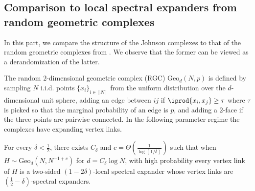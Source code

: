
\subsection{Comparison to local spectral expanders from random geometric complexes}
In this part, we compare the structure of the Johnson complexes to that of the random geometric complexes from \cite{LiuMSY2023}. 
We observe that the former can be viewed as a derandomization of the latter.



The random $2$-dimensional geometric complex (RGC) $\mathrm{Geo}_d(N,p)$ is defined by sampling $N$ i.i.d. points $\{x_i\}_{i\in[N]}$ from the uniform distribution over the $d$-dimensional unit sphere, adding an edge between $ij$ if $\iprod{x_i,x_j} \ge \tau$ where $\tau$ is picked so that the marginal probability of an edge is $p$, and adding a $2$-face if the three points are pairwise connected. In the following parameter regime the complexes have expanding vertex links.

\begin{theorem}
For every $\delta < \frac{1}{2}$, there exists $C_\delta$ and $c = \Theta\left(\frac{1}{\log (1/\delta)}\right)$ such that when $H \sim \mathrm{Geo}_d(N,N^{-1+c})$ for $d = C_\delta \log N$, with high probability every vertex link of $H$ is a two-sided $(1-2\delta)$-local spectral expander whose vertex links are $\left(\frac{1}{2} - \delta\right)$-spectral expanders.
\end{theorem}

